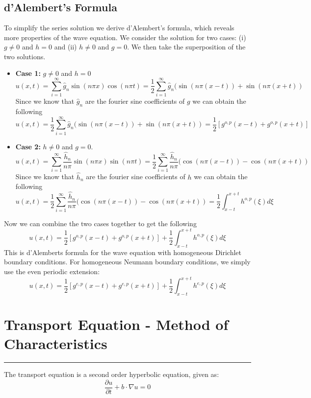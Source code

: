 \documentclass[11pt]{article}
\begin{document}
\subsection{d'Alembert's Formula}
To simplify the series solution we derive d’Alembert’s formula, which reveals more properties of the wave equation.  We consider the solution for two cases: (i) $g \neq 0$ and $h = 0$ and (ii) $h \neq 0$ and $g = 0$.  We then take the superposition of the two solutions.
\begin{itemize}
\item \textbf{Case 1:} $g \neq 0$ and $h = 0$
$$ u(x,t) = \sum_{i=1}^{\infty} \hat{g}_n \sin (n\pi x) \cos (n\pi t) = \frac{1}{2} \sum_{i=1}^{\infty} \hat{g}_n ( \sin (n\pi (x-t)) +  \sin (n\pi (x+t)) $$
Since we know that $ \hat{g}_n$ are the fourier sine coefficients of $g$ we can obtain the following 
$$ u(x,t) = \frac{1}{2} \sum_{i=1}^{\infty} \hat{g}_n ( \sin (n\pi (x-t)) +  \sin (n\pi (x+t))= \frac{1}{2} \left[ g^{o,p} (x-t) + g^{o,p} (x+t) \right] $$
\item \textbf{Case 2:} $h \neq 0$ and $g = 0$.
$$ u(x,t) = \sum_{i=1}^{\infty} \frac{\hat{h}_n}{n\pi} \sin (n\pi x) \sin (n\pi t) = \frac{1}{2} \sum_{i=1}^{\infty} \frac{\hat{h}_n}{n\pi} ( \cos (n\pi (x-t)) -  \cos (n\pi (x+t)) $$
Since we know that $ \hat{h}_n$ are the fourier sine coefficients of $h$ we can obtain the following 
$$ u(x,t) = \frac{1}{2} \sum_{i=1}^{\infty} \frac{\hat{h}_n}{n\pi} ( \cos (n\pi (x-t)) -  \cos (n\pi (x+t)) = \frac{1}{2} \int_{x-t}^{x+t} h^{o,p}(\xi) d\xi$$
\end{itemize}
Now we can  combine the two cases together to get the following
$$ u(x,t) =\frac{1}{2} \left[ g^{o,p} (x-t) + g^{o,p} (x+t) \right] + \frac{1}{2} \int_{x-t}^{x+t} h^{o,p}(\xi) d\xi $$
This is d'Alemberts formula for the wave equation with homogeneous Dirichlet boundary conditions. For homogeneous Neumann boundary conditions, we simply use the even periodic extension:
$$ u(x,t) =\frac{1}{2} \left[ g^{e,p} (x-t) + g^{e,p} (x+t) \right] + \frac{1}{2} \int_{x-t}^{x+t} h^{e,p}(\xi) d\xi $$
\pagebreak

\section{Transport Equation - Method of Characteristics}
\hrule \vspace{15pt}

The transport equation is a second order hyperbolic equation, given as: 
$$ \frac{\partial u}{\partial t} + b\cdot \nabla u = 0$$
\end{document}
